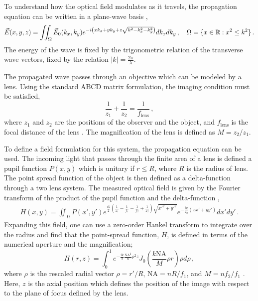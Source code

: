 To understand how the optical field modulates as it travels, the propagation equation can be written in a plane-wave basis \cite{goodman2017introduction},
\begin{equation}
	\vec E(x,y,z) = \iint_{\Omega} \vec E_0(k_x, k_y) e^{-i\left(x k_x + y k_y + z \sqrt{k^2 - k_x^2 - k_y^2} \right)}dk_x dk_y\,, \quad \Omega = \{x \in \mathbb{R} : x^2 \leq k^2\}\,.
\end{equation}
The energy of the wave is fixed by the trigonometric relation of the transverse wave vectors, fixed by the relation $|k| = \frac{2\pi}{\lambda}$.

The propagated wave passes through an objective which can be modeled by a lens. Using the standard ABCD matrix formulation, the imaging condition must be satisfied,
\begin{equation}
	\frac{1}{z_1} + \frac{1}{z_2} = \frac{1}{f_\mathrm{lens}}\,,
\end{equation}
where $z_1$ and $z_2$ are the positions of the observer and the object, and $f_\mathrm{lens}$ is the focal distance of the lens \cite{Steck2021}. The magnification of the lens is defined as $M = z_2/z_1$.
 
To define a field formulation for this system, the propagation equation can be used. The incoming light that passes through the finite area of a lens is defined a pupil function $P(x,y)$ which is unitary if $r\leq R$, where $R$ is the radius of lens. The point spread function of the object is then defined as a delta-function through a two lens system. The measured optical field is given by the Fourier transform of the product of the pupil function and the delta-function \cite{goodman2017introduction},
\begin{eqnarray}
	H(x,y) = \iint_\Omega P(x',y')e^{\frac{ik}{2}\left(\frac{1}{z_1} - \frac{1}{f_1} - \frac{1}{f_2} + \frac{1}{z_2}\right)\sqrt{{x'}^2 + {y'}^2}}e^{-\frac{ik}{z_2}(xx' + yy')}dx'dy'\,.
\end{eqnarray}
Expanding this field, one can use a zero-order Hankel transform to integrate over the radius and find that the point-spread function, $H$, is defined in terms of the numerical aperture and the magnification;
\begin{equation}
	H(r, z) = \int_0^1e^{-\frac{ik}{2}\frac{\text{NA}^2}{n}\rho^2 z}J_0\left(\frac{k\text{NA}}{M}\rho r\right) \rho d\rho\,,
\end{equation}
where $\rho$ is the rescaled radial vector $\rho= r'/R$, $\text{NA} = nR/f_1$, and $M = nf_2/f_1$ \cite{goodman2017introduction}. Here, $z$ is the axial position which defines the position of the image with respect to the plane of focus defined by the lens. 

